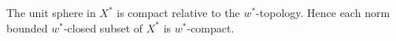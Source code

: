 The unit sphere in $X^*$ is compact relative to the $w^*$-topology. Hence each norm bounded $w^*$-closed subset of $X^*$ is $w^*$-compact.
